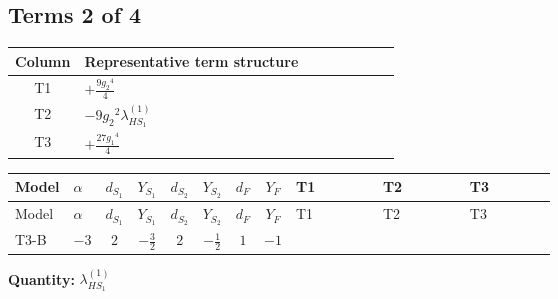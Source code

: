 \documentclass[8pt]{article}
\begin{document}
\begin{landscape}
\subsection*{Terms 2 of 4}
\begin{center}
\begin{tabular}{@{}c >{\raggedright\arraybackslash}p{0.82\linewidth}@{}}
\toprule
Column & Representative term structure \\
\midrule
T1 & \(\displaystyle +\frac{9 {g_2}^4}{4}\) \\
\midrule
T2 & \(\displaystyle -9 {g_2}^2 {\lambda_{HS_1}^{(1)}}\) \\
\midrule
T3 & \(\displaystyle +\frac{27 {g_1}^4}{4}\) \\
\midrule
\bottomrule
\end{tabular}
\end{center}
\smallskip
\tiny
\begin{longtable}{@{}llcccccc >{\raggedright\arraybackslash}p{0.21\linewidth} >{\raggedright\arraybackslash}p{0.21\linewidth} >{\raggedright\arraybackslash}p{0.21\linewidth}@{}}
\toprule
Model & $\alpha$ & $d_{S_1}$ & $Y_{S_1}$ & $d_{S_2}$ & $Y_{S_2}$ & $d_F$ & $Y_F$ & T1 & T2 & T3 \\
\midrule
\endfirsthead
\toprule
Model & $\alpha$ & $d_{S_1}$ & $Y_{S_1}$ & $d_{S_2}$ & $Y_{S_2}$ & $d_F$ & $Y_F$ & T1 & T2 & T3 \\
\midrule
\endhead
T3-B & $-3$ & $2$ & $-\frac{3}{2}$ & $2$ & $-\frac{1}{2}$ & $1$ & $-1$ & \scriptsize\adjustbox{max width=\linewidth}{$\begin{gathered} +\frac{9 {g_2}^4}{4}\end{gathered}$} & \scriptsize\adjustbox{max width=\linewidth}{$\begin{gathered} -9 {g_2}^2 {\lambda_{HS_1}^{(1)}}\end{gathered}$} & \scriptsize\adjustbox{max width=\linewidth}{$\begin{gathered} +\frac{27 {g_1}^4}{4}\end{gathered}$} \\
\midrule
\bottomrule
\end{longtable}
\clearpage
\noindent\textbf{Quantity: }$\lambda_{HS_1}^{(1)}$\par\smallskip

\end{landscape}
\end{document}
